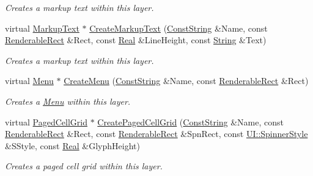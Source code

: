 \begin{DoxyCompactItemize}
\begin{DoxyCompactList}\small\item\em Creates a markup text within this layer. \item\end{DoxyCompactList}\item 
virtual \hyperlink{classMezzanine_1_1UI_1_1MarkupText}{MarkupText} $\ast$ \hyperlink{classMezzanine_1_1UI_1_1Layer_a32aee6b1ea0d7550b096a0c4e4bb42db}{CreateMarkupText} (\hyperlink{namespaceMezzanine_a63cd699ac54b73953f35ec9cfc05e506}{ConstString} \&Name, const \hyperlink{structMezzanine_1_1UI_1_1RenderableRect}{RenderableRect} \&Rect, const \hyperlink{namespaceMezzanine_a726731b1a7df72bf3583e4a97282c6f6}{Real} \&LineHeight, const \hyperlink{namespaceMezzanine_acf9fcc130e6ebf08e3d8491aebcf1c86}{String} \&Text)
\begin{DoxyCompactList}\small\item\em Creates a markup text within this layer. \item\end{DoxyCompactList}\item 
virtual \hyperlink{classMezzanine_1_1UI_1_1Menu}{Menu} $\ast$ \hyperlink{classMezzanine_1_1UI_1_1Layer_a1afed25c24527f926959083fa23a61ea}{CreateMenu} (\hyperlink{namespaceMezzanine_a63cd699ac54b73953f35ec9cfc05e506}{ConstString} \&Name, const \hyperlink{structMezzanine_1_1UI_1_1RenderableRect}{RenderableRect} \&Rect)
\begin{DoxyCompactList}\small\item\em Creates a \hyperlink{classMezzanine_1_1UI_1_1Menu}{Menu} within this layer. \item\end{DoxyCompactList}\item 
virtual \hyperlink{classMezzanine_1_1UI_1_1PagedCellGrid}{PagedCellGrid} $\ast$ \hyperlink{classMezzanine_1_1UI_1_1Layer_a10917135a026ca597f5f5313a6ec4e10}{CreatePagedCellGrid} (\hyperlink{namespaceMezzanine_a63cd699ac54b73953f35ec9cfc05e506}{ConstString} \&Name, const \hyperlink{structMezzanine_1_1UI_1_1RenderableRect}{RenderableRect} \&Rect, const \hyperlink{structMezzanine_1_1UI_1_1RenderableRect}{RenderableRect} \&SpnRect, const \hyperlink{namespaceMezzanine_1_1UI_a62462d4df783dcdda77e1590a96bc6d6}{UI::SpinnerStyle} \&SStyle, const \hyperlink{namespaceMezzanine_a726731b1a7df72bf3583e4a97282c6f6}{Real} \&GlyphHeight)
\begin{DoxyCompactList}\small\item\em Creates a paged cell grid within this layer. \item\end{DoxyCompactList}\item 

\end{DoxyCompactItemize}
